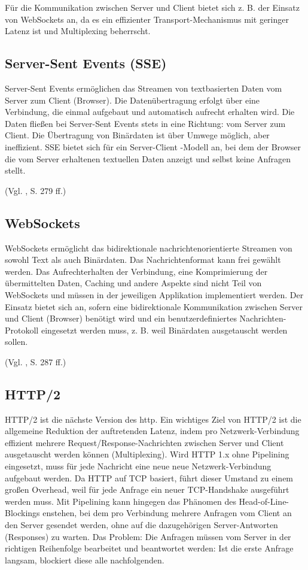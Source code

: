 Für die Kommunikation zwischen Server und Client bietet sich z. B. der
Einsatz von WebSockets an, da es ein effizienter Transport-Mechanismus
mit geringer Latenz ist und Multiplexing beherrscht.

\subsection{Server-Sent Events (SSE)}\label{server-sent-events-sse}

Server-Sent Events ermöglichen das Streamen von textbasierten Daten vom
Server zum Client (Browser). Die Datenübertragung erfolgt über eine
Verbindung, die einmal aufgebaut und automatisch aufrecht erhalten wird.
Die Daten fließen bei Server-Sent Events stets in eine Richtung: vom Server zum Client.
Die Übertragung von Binärdaten ist über Umwege
möglich, aber ineffizient. SSE bietet sich für ein Server-Client -Modell
an, bei dem der Browser die vom Server erhaltenen textuellen Daten
anzeigt und selbst keine Anfragen stellt.

(Vgl. \cite{Grigorik2013}, S. 279 ff.)

\subsection{WebSockets}\label{websockets}

WebSockets ermöglicht das bidirektionale nachrichtenorientierte Streamen
von sowohl Text als auch Binärdaten. Das Nachrichtenformat kann frei
gewählt werden. Das Aufrechterhalten der Verbindung, eine Komprimierung
der übermittelten Daten, Caching und andere Aspekte sind nicht Teil von
WebSockets und müssen in der jeweiligen Applikation implementiert
werden. Der Einsatz bietet sich an, sofern eine bidirektionale
Kommunikation zwischen Server und Client (Browser) benötigt wird und ein
benutzerdefiniertes Nachrichten-Protokoll eingesetzt werden muss, z. B.
weil Binärdaten ausgetauscht werden sollen.

(Vgl. \cite{Grigorik2013}, S. 287 ff.)

\subsection{HTTP/2}\label{http2}

HTTP/2 ist die nächste Version des \Gls{http}. Ein
wichtiges Ziel von HTTP/2 ist die allgemeine Reduktion der auftretenden Latenz,
indem pro Netzwerk-Verbindung effizient mehrere Request/Response-Nachrichten zwischen
Server und Client ausgetauscht werden können (Multiplexing). Wird HTTP
1.x ohne Pipelining eingesetzt, muss für jede Nachricht eine neue neue
Netzwerk-Verbindung aufgebaut werden. Da HTTP auf TCP basiert, führt
dieser Umstand zu einem großen Overhead, weil für jede Anfrage ein neuer
TCP-Handshake ausgeführt werden muss. Mit Pipelining kann hingegen das
Phänomen des Head-of-Line-Blockings enstehen, bei dem pro Verbindung
mehrere Anfragen vom Client an den Server gesendet werden, ohne auf die
dazugehörigen Server-Antworten (Responses) zu warten. Das Problem: Die Anfragen
müssen vom Server in der richtigen Reihenfolge bearbeitet und
beantwortet werden: Ist die erste Anfrage langsam, blockiert diese alle
nachfolgenden.

